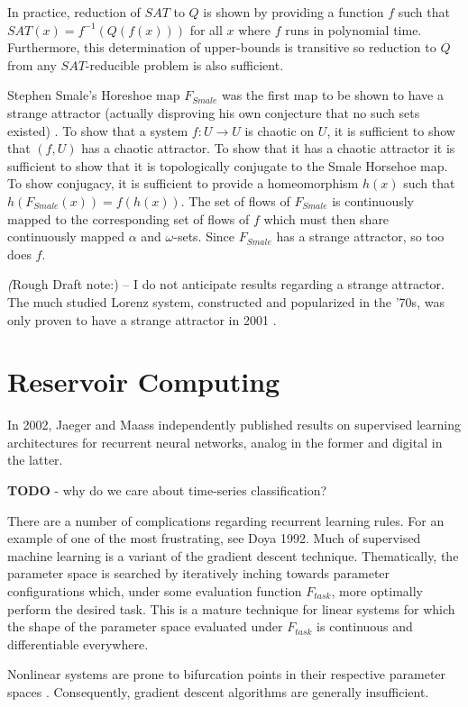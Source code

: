 \documentclass{elsart}
\begin{document}
In practice, reduction of $SAT$ to $Q$ is shown by providing a function $f$ 
such that
$SAT(x) = f^{-1}(Q(f(x)))$ for all $x$ where $f$ runs in polynomial time.
Furthermore, this determination of upper-bounds is transitive so reduction 
to $Q$ from any $SAT$-reducible problem is also sufficient.\cite{complexity}

Stephen Smale's Horeshoe map $F_{Smale}$ was the first map to be shown to 
have a strange
attractor (actually disproving his own conjecture that no such sets existed)
\cite{history}.  To show that a system $f : U \rightarrow U$ is chaotic
on $U$, 
it is sufficient
to show that $(f,U)$ has a chaotic attractor.  To show that it has a
chaotic attractor it is sufficient to show that it is topologically conjugate
to the Smale Horsehoe map.  To show conjugacy, it is sufficient
to provide a homeomorphism $h(x)$ such that $h(F_{Smale}(x)) = f(h(x))$.
The set of flows of $F_{Smale}$ is continuously mapped to the
corresponding set of flows of $f$ which must then share continuously
mapped $\alpha$ and $\omega$-sets.  Since $F_{Smale}$ has a strange
attractor, so too does $f$.

\textit(Rough Draft note:)  -- I do not anticipate results regarding
a strange attractor.  The much studied Lorenz system, constructed and
popularized in the '70s, was only proven to have a strange attractor
in 2001 \cite{warwick}.

\section{Reservoir Computing}
In 2002, Jaeger and Maass independently published results on supervised
learning architectures for recurrent neural networks, analog in the former
and digital in the latter.

\textbf{TODO} - why do we care about time-series classification?

There are a number of complications regarding
recurrent learning rules.  For an example of one of the most frustrating,
see Doya 1992.  Much of supervised machine learning is a variant of the
gradient descent technique.  Thematically, the parameter space is searched
by iteratively inching towards parameter configurations which, under
some evaluation function $F_{task}$, more optimally perform the desired task.
This is a mature technique for linear systems for which the shape of 
the parameter space evaluated under $F_{task}$ is continuous and differentiable everywhere.

Nonlinear systems are prone to bifurcation points in their respective 
parameter spaces \cite{doya}.
Consequently, gradient descent algorithms are generally insufficient.
\end{document}
